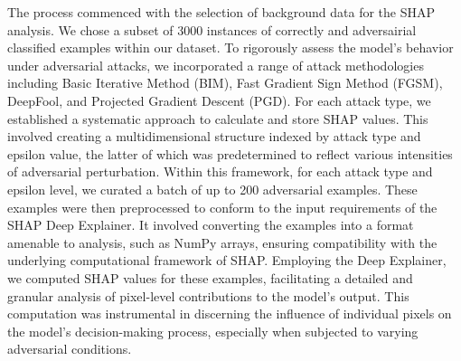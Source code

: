 \documentclass[10pt, conference, a4paper, final]{IEEEtran}
\begin{document}
The process commenced with the selection of background data for the SHAP analysis. We chose a subset of 3000 instances of correctly and adversairial classified examples within our dataset. To rigorously assess the model's behavior under adversarial attacks, we incorporated a range of attack methodologies including Basic Iterative Method (BIM), Fast Gradient Sign Method (FGSM), DeepFool, and Projected Gradient Descent (PGD). For each attack type, we established a systematic approach to calculate and store SHAP values. This involved creating a multidimensional structure indexed by attack type and epsilon value, the latter of which was predetermined to reflect various intensities of adversarial perturbation. Within this framework, for each attack type and epsilon level, we curated a batch of up to 200  adversarial examples. These examples were then preprocessed to conform to the input requirements of the SHAP Deep Explainer. It involved converting the examples into a format amenable to analysis, such as NumPy arrays, ensuring compatibility with the underlying computational framework of SHAP. Employing the Deep Explainer, we computed SHAP values for these examples, facilitating a detailed and granular analysis of pixel-level contributions to the model’s output. This computation was instrumental in discerning the influence of individual pixels on the model's decision-making process, especially when subjected to varying adversarial conditions.



\end{document}
